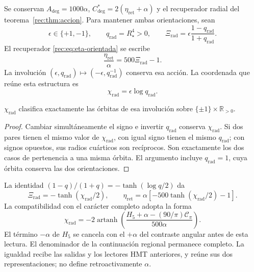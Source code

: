 Se conservan $A_{\deg}=1000\alpha$,
$C^*_{\deg}=2(\eta_{\mathrm{ret}}+\alpha)$ y el recuperador radial del
teorema~\ref{rec:thm:accion}. Para mantener ambas orientaciones, sean
\begin{equation}
 \epsilon\in\{+1,-1\},\qquad
 q_{\mathrm{rad}}=R_\star^4>0,\qquad
 \Xi_{\mathrm{rad}}=
 \epsilon\frac{1-q_{\mathrm{rad}}}{1+q_{\mathrm{rad}}}.
 \label{md:restop:par-radial}
\end{equation}
El recuperador \eqref{rec:eq:eta-orientada} se escribe
\begin{equation}
 \frac{\eta_{\mathrm{ret}}}{\alpha}=500\Xi_{\mathrm{rad}}-1.
 \label{md:restop:recuperador}
\end{equation}
La involución
$(\epsilon,q_{\mathrm{rad}})
 \mapsto(-\epsilon,q_{\mathrm{rad}}^{-1})$
conserva esa acción. La coordenada que reúne esta estructura es
\begin{equation}
 \boxed{\chi_{\mathrm{rad}}=\epsilon\log q_{\mathrm{rad}}.}
 \label{md:restop:chi}
\end{equation}

\begin{proposition}
\label{md:restop:proposicion-orbitas}
$\chi_{\mathrm{rad}}$ clasifica exactamente las órbitas de esa involución
sobre $\{\pm1\}\times\mathbb R_{>0}$.
\end{proposition}
\begin{proof}
Cambiar simultáneamente el signo e invertir $q_{\mathrm{rad}}$ conserva
$\chi_{\mathrm{rad}}$. Si dos pares tienen el mismo valor de
$\chi_{\mathrm{rad}}$, con igual signo tienen el mismo
$q_{\mathrm{rad}}$; con signos opuestos, sus radios cuárticos son
recíprocos. Son exactamente los dos casos de pertenencia a una misma
órbita. El argumento incluye $q_{\mathrm{rad}}=1$, cuya órbita conserva
las dos orientaciones.
\end{proof}

La identidad
$(1-q)/(1+q)=-\tanh(\log q/2)$ da
\begin{equation}
 \Xi_{\mathrm{rad}}
 =-\tanh(\chi_{\mathrm{rad}}/2),\qquad
 \boxed{\eta_{\mathrm{ret}}
 =\alpha[-500\tanh(\chi_{\mathrm{rad}}/2)-1].}
 \label{md:restop:accion-chi}
\end{equation}
La compatibilidad con el carácter completo adopta la forma
\begin{equation}
 \boxed{\chi_{\mathrm{rad}}
 =-2\operatorname{artanh}
 \left(\frac{H_5+\alpha-(90/\pi)\mathcal C_\pi}{500\alpha}\right).}
 \label{md:restop:chi-caracter}
\end{equation}
El término $-\alpha$ de $H_5$ se cancela con el $+\alpha$ del
contraste angular antes de esta lectura. El denominador de la
continuación regional permanece completo. La igualdad recibe las
salidas y los lectores HMT anteriores, y reúne sus dos representaciones;
no define retroactivamente $\alpha$.


